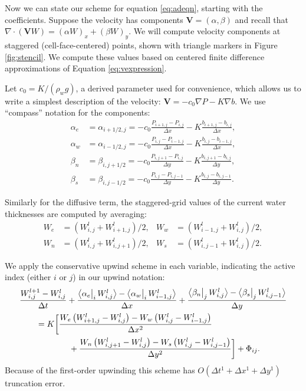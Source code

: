 \documentclass[12pt,final]{amsart}%
\newcommand\bV{\mathbf{V}}
\newcommand{\Div}{\nabla\cdot}
\newcommand{\grad}{\nabla}
\newcommand{\Wlij}{W^l_{i,j}}
\newcommand{\upp}[3]{\big<#1\big|_{#3}\,#2\big>}
\begin{document}
Now we can state our scheme for equation \eqref{eq:adeqn}, starting with the coefficients.  Suppose the velocity has components $\bV = (\alpha,\beta)$ and recall that $\Div \left(\bV W\right) = (\alpha W)_x + (\beta W)_y$.  We will compute velocity components at staggered (cell-face-centered) points, shown with triangle markers in Figure \ref{fig:stencil}.  We compute these values based on centered finite difference approximations of Equation \eqref{eq:vexpression}.

Let $c_0=K/(\rho_w g)$, a derived parameter used for convenience, which allows us to write a simplest description of the velocity:  $\bV = - c_0 \grad P - K \grad b$.  We use ``compass'' notation for the components:
\begin{align*}
\alpha_e &= \alpha_{i+1/2,j} = - c_0 \frac{P_{i+1,j}-P_{i,j}}{\Delta x} - K \frac{b_{i+1,j}-b_{i,j}}{\Delta x}, \\
\alpha_w &= \alpha_{i-1/2,j} = - c_0 \frac{P_{i,j}-P_{i-1,j}}{\Delta x} - K \frac{b_{i,j}-b_{i-1,j}}{\Delta x}, \\
\beta_n  &= \beta_{i,j+1/2} = - c_0 \frac{P_{i,j+1}-P_{i,j}}{\Delta y} - K \frac{b_{i,j+1}-b_{i,j}}{\Delta y}, \\
\beta_s  &= \beta_{i,j-1/2} = - c_0 \frac{P_{i,j}-P_{i,j-1}}{\Delta y} - K \frac{b_{i,j}-b_{i,j-1}}{\Delta y}.
\end{align*}

Similarly for the diffusive term, the staggered-grid values of the current water thicknesses are computed by averaging:
\begin{align*}
W_e &= (W_{i,j}^l + W_{i+1,j}^l)/2, & W_w &= (W_{i-1,j}^l + W_{i,j}^l)/2, \\
W_n &= (W_{i,j}^l + W_{i,j+1}^l)/2, & W_s &= (W_{i,j-1}^l + W_{i,j}^l)/2.
\end{align*}

We apply the conservative upwind scheme in each variable, indicating the active index (either $i$ or $j$) in our upwind notation:
\begin{align}
 &\frac{W_{i,j}^{l+1} - \Wlij}{\Delta t} + \frac{\upp{\alpha_e}{\Wlij}{i} - \upp{\alpha_w}{W_{i-1,j}^l}{i}}{\Delta x} + \frac{\upp{\beta_n}{\Wlij}{j} - \upp{\beta_s}{W_{i,j-1}^l}{j}}{\Delta y}  \label{eq:Wfd} \\
      &\qquad = K \bigg[\frac{W_e \left(W_{i+1,j}^l - \Wlij\right) - W_w \left(\Wlij - W_{i-1,j}^l\right)}{\Delta x^2}  \notag \\
      &\qquad\qquad\qquad + \frac{W_n \left(W_{i,j+1}^l - \Wlij\right) - W_s \left(\Wlij - W_{i,j-1}^l\right)}{\Delta y^2}\bigg] + \Phi_{ij}. \notag
\end{align}
Because of the first-order upwinding this scheme has $O(\Delta t^1 + \Delta x^1 + \Delta y^1)$ truncation error.
\end{document}
